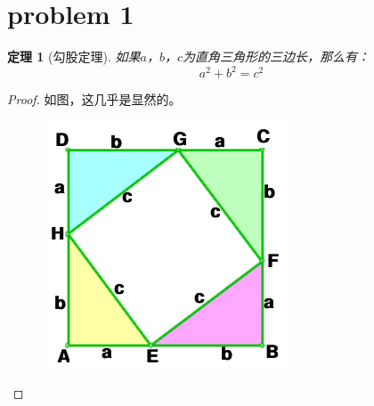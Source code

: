\documentclass[a4paper,11pt]{ctexart}
\newtheorem{thm}{定理}[section]
\begin{document}
\section{problem 1}
\begin{thm}[勾股定理]
    如果$a$，$b$，$c$为直角三角形的三边长，那么有：
    \[a^2+b^2=c^2
    \]
\end{thm}
\begin{proof}
    如图，这几乎是显然的。
    \begin{figure}[h]
        \centering
        \includegraphics{gougu.png}
    \end{figure}
\end{proof}
\end{document}
